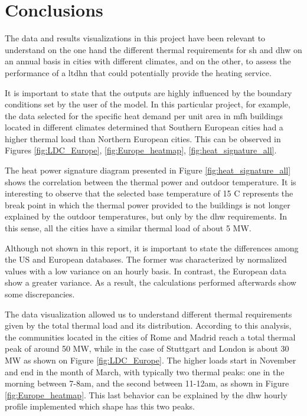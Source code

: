 \documentclass{article}
\begin{document}
\clearpage
\section{Conclusions}

The data and results visualizations in this project have been relevant to understand on the one hand the different thermal requirements for \gls{sh} and \gls{dhw} on an annual basis in cities with different climates, and on the other, to assess the performance of a \gls{ltdhn} that could potentially provide the heating service.

It is important to state that the outputs are highly influenced by the boundary conditions set by the user of the model. In this particular project, for example, the data selected for the specific heat demand per unit area in \gls{mfh} buildings located in different climates determined that Southern European cities had a higher thermal load than Northern European cities. This can be observed in Figures \ref{fig:LDC_Europe}, \ref{fig:Europe_heatmap}, \ref{fig:heat_signature_all}.

The heat power signature diagram presented in Figure \ref{fig:heat_signature_all} shows the correlation between the thermal power and outdoor temperature. It is interesting to observe that the selected base temperature of 15 \degree C represents the break point in which the thermal power provided to the buildings is not longer explained by the outdoor temperatures, but only by the \gls{dhw} requirements. In this sense, all the cities have a similar thermal load of about 5 MW.

Although not shown in this report, it is important to state the differences among the US and European databases. The former was characterized by normalized values with a low variance on an hourly basis. In contrast, the European data show a greater variance. As a result, the calculations performed afterwards show some discrepancies.

The data visualization allowed us to understand different thermal requirements given by the total thermal load and its distribution. According to this analysis, the communities located in the cities of Rome and Madrid reach a total thermal peak of around 50 MW, while in the case of Stuttgart and London is about 30 MW as shown on Figure \ref{fig:LDC_Europe}. The higher loads start in November and end in the month of March, with typically two thermal peaks: one in the morning between 7-8am, and the second between 11-12am, as shown in Figure \ref{fig:Europe_heatmap}. This last behavior can be explained by the \gls{dhw} hourly profile implemented which shape has this two peaks.  
\end{document}
